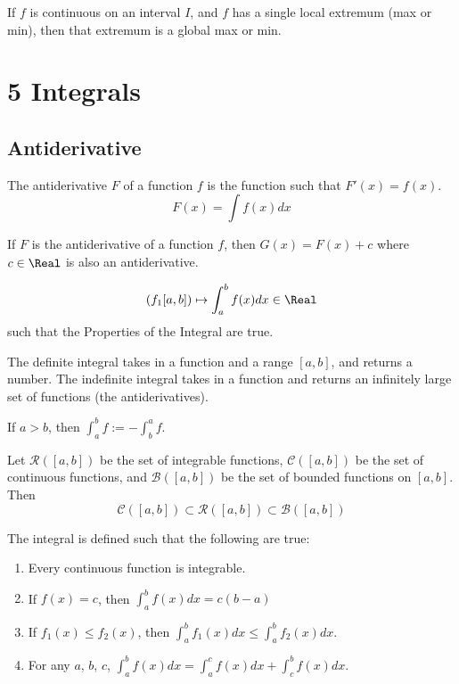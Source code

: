 \begin{namedtheorem}
  If $f$ is continuous on an interval $I$, and $f$ has a single local extremum (max or min), then that extremum is a global max or min.
\end{namedtheorem}

\columnbreak

\section*{5 Integrals}

\subsection*{Antiderivative}

\begin{definition}
  The antiderivative $F$ of a function $f$ is the function such that $F'(x) = f(x)$.
  \[
    F(x) = \int f(x) dx
  \]
\end{definition}

\begin{theorem}
  If $F$ is the antiderivative of a function $f$, then $G(x) = F(x) + c$ where $c \in \Real$ is also an antiderivative.
\end{theorem}

\begin{definition}[Integral]
  \[
    (f_1 [a, b]) \mapsto \int_a^b f(x)dx \in \Real
  \]
  such that the Properties of the Integral are true.
\end{definition}

The definite integral takes in a function and a range $[a, b]$, and returns a number. The indefinite integral takes in a function and returns an infinitely large set of functions (the antiderivatives).

If $a > b$, then $\int_a^b f := -\int_b^a f$.

Let $\mathcal{R}([a,b])$ be the set of integrable functions, $\mathcal{C}([a,b])$ be the set of continuous functions, and $\mathcal{B}([a,b])$ be the set of bounded functions on $[a, b]$. Then
\[
  \mathcal{C}([a,b]) \subset \mathcal{R}([a,b]) \subset \mathcal{B}([a,b])
\]

\begin{theorem}
  The integral is defined such that the following are true:
  \begin{enumerate}[start=0,label={(I\arabic*)}]
    \item Every continuous function is integrable.
    \item If $f(x) = c$, then $\int_a^b f(x) dx = c(b - a)$
    \item If $f_1(x) \leq f_2(x)$, then $\int_a^b f_1(x)dx \leq \int_a^b f_2(x)dx$.
    \item For any $a$, $b$, $c$, $\displaystyle \int_a^b f(x)dx = \int_a^c f(x)dx + \int_c^b f(x)dx$.
  \end{enumerate}
\end{theorem}

